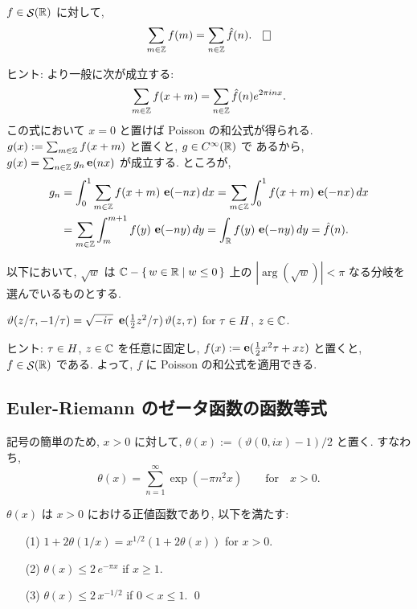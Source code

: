 \documentclass[12pt,twoside]{jarticle}
\begin{document}
\begin{question}
  $f \in \mathop{\mathcal{S}}\nolimits({\mathbb R})$ に対して, 
  \[
    \sum_{m\in\Z} f(m) = \sum_{n\in\Z} \hat f(n).
  \qed
  \]
\end{question}

\noindent ヒント: より一般に次が成立する:
\[
  \sum_{m\in{\mathbb Z}} f(x+m) = \sum_{n\in{\mathbb Z}} \hat f(n) e^{2\pi inx}.
\]%
この式において $x=0$ と置けば Poisson の和公式が得られる. %
$g(x) := \sum_{m\in{\mathbb Z}} f(x+m)$ と置くと, $g \in \text{$C^{\infty}$}({\mathbb R})$ で
あるから,
\(
  g(x) = \sum_{n\in{\mathbb Z}} g_n \mathop{\mathbf{e}}\nolimits(nx)
\)%
が成立する. ところが, 
\begin{align*}
  g_n & = \int_0^1 \sum_{m\in{\mathbb Z}} f(x+m) \, \mathop{\mathbf{e}}\nolimits(-nx) \,dx 
        = \sum_{m\in{\mathbb Z}} \int_0^1 f(x+m) \, \mathop{\mathbf{e}}\nolimits(-nx) \,dx \\
      & = \sum_{m\in{\mathbb Z}} \int_{m}^{m+1} f(y) \, \mathop{\mathbf{e}}\nolimits(-ny) \,dy
        = \int_{\mathbb R} f(y) \, \mathop{\mathbf{e}}\nolimits(-ny) \,dy = \hat f(n).
\end{align*}

以下において, $\sqrt{w}$ は ${\mathbb C} - \{\,w\in{\mathbb R}\mid w \le 0\,\}$ 上の 
$|\arg(\sqrt{w})| < \pi$ なる分岐を選んでいるものとする. 

\begin{question}[テータ函数の函数等式]
  \(
    \vartheta(z/\tau, -1/\tau)
    = \sqrt{-i\tau}
      \,\, \mathop{\mathbf{e}}\nolimits(\frac{1}{2} z^2/\tau)
      \, \vartheta(z,\tau)
  \)
  \quad
  for $\tau\in H$, $z\in{\mathbb C}$.
\end{question}

\noindent ヒント: $\tau\in H$, $z\in{\mathbb C}$ を任意に固定し, %
$f(x) := \mathop{\mathbf{e}}\nolimits(\frac{1}{2}x^2\tau + xz)$ と置くと, $f\in\mathop{\mathcal{S}}\nolimits({\mathbb R})$ である. 
よって, $f$ に Poisson の和公式を適用できる. 


\subsection{Euler-Riemann のゼータ函数の函数等式}

記号の簡単のため, $x>0$ に対して, $\theta(x):=(\vartheta(0,ix)-1)/2$ 
と置く. すなわち,
\[
  \theta(x) = \sum_{n=1}^\infty \exp(- \pi n^2 x)
  \qquad\text{for}\quad x > 0.
\]%

\begin{question}\label{q:Theta-junbi}
  $\theta(x)$ は $x > 0$ における正値函数であり, 以下を満たす:
  \begin{enumerate}
  \item[(1)]
    $1 + 2\theta(1/x) = x^{1/2} (1 + 2\theta(x))$ \quad for $x > 0$.
  \item[(2)]
    $\theta(x) \le 2 \, e^{- \pi x}$ \quad if $x \ge 1$.
  \item[(3)]
    $\theta(x) \le 2 \, x^{-1/2}$    \enspace if $0 < x \le 1$.
  \qed
  \end{enumerate}
\end{question}
\end{document}
